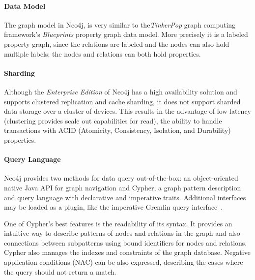 \paragraph{Data Model}
The graph model in Neo4j,  is very similar to the\emph{TinkerPop} graph computing framework's \emph{Blueprints} property graph data model. More precisely it is a labeled property graph, since the relations are labeled and the nodes can also hold multiple labels; the nodes and relations can both hold properties.

\paragraph{Sharding}
Although the \emph{Enterprise Edition} of Neo4j has a high availability solution and supports clustered replication and cache sharding, it does not support sharded data storage over a cluster of devices. This results in the advantage of low latency (clustering provides scale out capabilities for read), the ability to handle transactions with ACID (Atomicity, Consistency, Isolation, and Durability) properties.~\cite{neo4j-product}

\paragraph{Query Language}
Neo4j provides two methods for data query out-of-the-box: an object-oriented native Java API for graph navigation and Cypher, a graph pattern description and query language with declarative and imperative traits. Additional interfaces may be loaded as a plugin, like the imperative Gremlin query interface~\cite{neo4j-gremlin-plugin}.

One of Cypher's best features is the readability of its syntax. It provides an intuitive way to describe patterns of nodes and relations in the graph and also connections between subpatterns using bound identifiers for nodes and relations. Cypher also manages the indexes and constraints of the graph database. Negative application conditions (NAC) can be also expressed, describing the cases where the query should not return a match.

